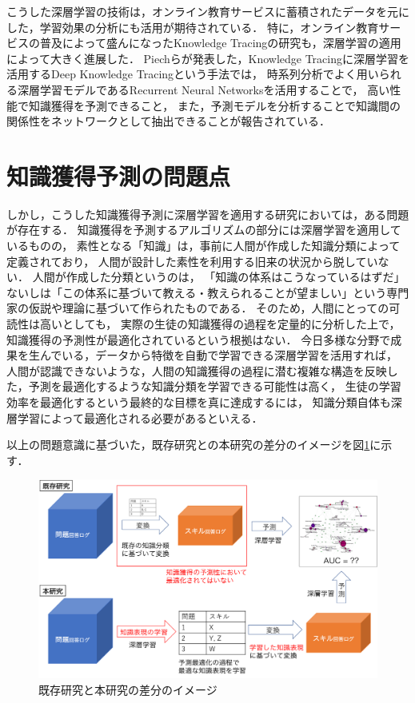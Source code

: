 こうした深層学習の技術は，オンライン教育サービスに蓄積されたデータを元にした，学習効果の分析にも活用が期待されている．
特に，オンライン教育サービスの普及によって盛んになったKnowledge Tracingの研究も，深層学習の適用によって大きく進展した．
Piechらが発表した，Knowledge Tracingに深層学習を活用するDeep Knowledge Tracingという手法では，
時系列分析でよく用いられる深層学習モデルであるRecurrent Neural Networks\cite{williams1989learning}を活用することで，
高い性能で知識獲得を予測できること，
また，予測モデルを分析することで知識間の関係性をネットワークとして抽出できることが報告されている\cite{piech2015deep}．


\section{知識獲得予測の問題点}

しかし，こうした知識獲得予測に深層学習を適用する研究においては，ある問題が存在する．
知識獲得を予測するアルゴリズムの部分には深層学習を適用しているものの，
素性となる「知識」は，事前に人間が作成した知識分類によって定義されており，
人間が設計した素性を利用する旧来の状況から脱していない．
人間が作成した分類というのは，
「知識の体系はこうなっているはずだ」ないしは「この体系に基づいて教える・教えられることが望ましい」という専門家の仮説や理論に基づいて作られたものである．
そのため，人間にとっての可読性は高いとしても，
実際の生徒の知識獲得の過程を定量的に分析した上で，知識獲得の予測性が最適化されているという根拠はない．
今日多様な分野で成果を生んでいる，データから特徴を自動で学習できる深層学習を活用すれば，
人間が認識できないような，人間の知識獲得の過程に潜む複雑な構造を反映した，予測を最適化するような知識分類を学習できる可能性は高く，
生徒の学習効率を最適化するという最終的な目標を真に達成するには，
知識分類自体も深層学習によって最適化される必要があるといえる．


以上の問題意識に基づいた，既存研究との本研究の差分のイメージを図\ref{fig:problem}に示す．
\begin{figure}[htb]
\begin{center}
\includegraphics[width=350pt]{./img/problem2.png}
\end{center}
\caption{既存研究と本研究の差分のイメージ}
\label{fig:problem}
\end{figure}


